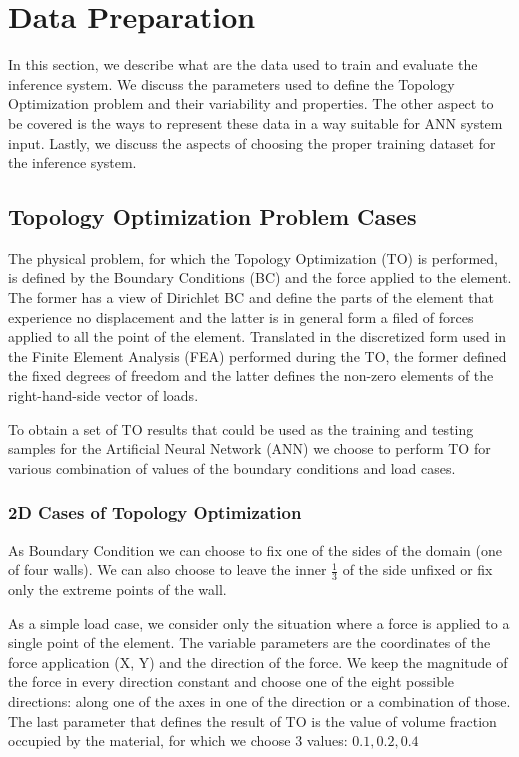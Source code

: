 
\section{Data Preparation}

In this section, we describe what are the data used to train and evaluate the inference system.
We discuss the parameters used to define the Topology Optimization problem and their variability and properties.
The other aspect to be covered is the ways to represent these data in a way suitable for ANN system input.
Lastly, we discuss the aspects of choosing the proper training dataset for the inference system.

\subsection{Topology Optimization Problem Cases}

The physical problem, for which the Topology Optimization (TO) is performed, is defined by the Boundary Conditions (BC) and the force applied to the element. 
The former has a view of Dirichlet BC and define the parts of the element that experience no displacement and the latter is in general form a filed of forces applied to all the point of the element. 
Translated in the discretized form used in the Finite Element Analysis (FEA) performed during the TO, the former defined the fixed degrees of freedom and the latter defines the non-zero elements of the right-hand-side vector of loads.
\medskip

To obtain a set of TO results that could be used as the training and testing samples for the Artificial Neural Network (ANN) we choose to perform TO for various combination of values of the boundary conditions and load cases.
\medskip

\subsubsection{2D Cases of Topology Optimization}

As Boundary Condition we can choose to fix one of the sides of the domain (one of four walls). 
We can also choose to leave the inner $\frac{1}{3}$ of the side unfixed or fix only the extreme points of the wall. 
\medskip

As a simple load case, we consider only the situation where a force is applied to a single point of the element. 
The variable parameters are the coordinates of the force application (X, Y) and the direction of the force.
We keep the magnitude of the force in every direction constant and choose one of the eight possible directions: along one of the axes in one of the direction or a combination of those.
The last parameter that defines the result of TO is the value of volume fraction occupied by the material, for which we choose $3$ values: $0.1, 0.2, 0.4$
\medskip

